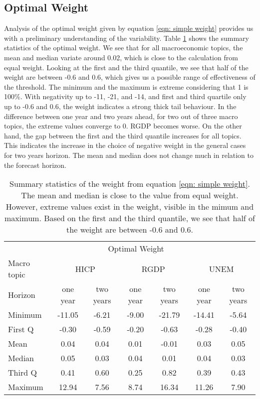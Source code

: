 \documentclass[11pt]{article}
\begin{document}
\subsection{Optimal Weight}\label{optimal-weight}
Analysis of the optimal weight given by equation \ref{eqn: simple weight} provides us with a preliminary understanding of the variability. Table \ref{tab: simple weight summary statistics} shows the summary statistics of the optimal weight. We see that for all macroeconomic topics, the mean and median variate around 0.02, which is close to the calculation from equal weight. Looking at the first and the third quantile, we see that half of the weight are between -0.6 and 0.6, which gives us a possible range of effectiveness of the threshold. The minimum and the maximum is extreme considering that 1 is 100\%. With negativity up to -11, -21, and -14, and first and third quartile only up to -0.6 and 0.6, the weight indicates a strong thick tail behaviour. In the difference between one year and two years ahead, for two out of three macro topics, the extreme values converge to 0. RGDP becomes worse. On the other hand, the gap between the first and the third quantile increases for all topics. This indicates the increase in the choice of negative weight in the general cases for two years horizon. The mean and median does not change much in relation to the forecast horizon.

\begin{table}[!h]
	\centering
	\caption{Summary statistics of the weight from equation \ref{eqn: simple weight}. The mean and median is close to the value from equal weight. However, extreme values exist in the weight, visible in the mimum and maximum. Based on the first and the third quantile, we see that half of the weight are between -0.6 and 0.6.}
	\label{tab: simple weight summary statistics}
	\begin{tabular}{lcccccc}%
		\hline
		&\multicolumn{5}{c}{Optimal Weight}\\
		\cmidrule(lr){2-7}
		Macro topic & \multicolumn{2}{c}{HICP} & \multicolumn{2}{c}{RGDP} & \multicolumn{2}{c}{UNEM} \\
		\cmidrule(lr){2-3} \cmidrule(lr){4-5}\cmidrule(lr){6-7}
		Horizon     & one year & two years & one year & two years & one year & two years \\ 
		\hline
		Minimum      & -11.05      & -6.21      & -9.00      & -21.79      & -14.41      & -5.64      \\
		First Q      & -0.30       & -0.59      & -0.20      & -0.63       & -0.28       & -0.40      \\
		Mean         & 0.04        & 0.04       & 0.01       & -0.01       & 0.03        & 0.05       \\
		Median       & 0.05        & 0.03       & 0.04       & 0.01        & 0.04        & 0.03       \\
		Third Q      & 0.41        & 0.60       & 0.25       & 0.82        & 0.39        & 0.43       \\
		Maximum      & 12.94       & 7.56       & 8.74       & 16.34       & 11.26       & 7.90       \\ 
		\hline
	\end{tabular}
\end{table}
\end{document}
